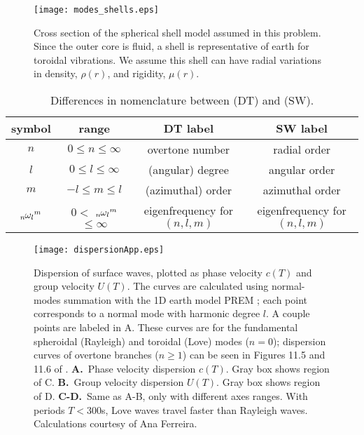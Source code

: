 \documentclass[11pt,titlepage,fleqn]{article}
\newcommand{\omnl}{\mbox{${}_{n\hspace{-0.2 mm}}\omega_l$}}
\begin{document}

\begin{figure}[h]
\begin{center}
\texttt{[image: modes\_shells.eps]}
\caption[]
{{
Cross section of the spherical shell model assumed in this problem. Since the outer core is fluid, a shell is representative of earth for toroidal vibrations. We assume this shell can have radial variations in density, $\rho(r)$, and rigidity, $\mu(r)$.
\label{fig:shells}
}}
\end{center}
\end{figure}



\begin{table}[h]
\begin{center}
\caption[]
{{
Differences in nomenclature between \citet{DT} (DT) and \citet{SteinWysession} (SW).
\label{tab:names}
}}
\tgap
\begin{tabular}{||c|c|c|c||}
\hline
symbol & range & DT label & SW label \\ \hline\hline
$n$ & $0 \le n \le \infty$ & overtone number & radial order \\ \hline
$l$ & $0 \le l \le \infty$ & (angular) degree & angular order \\ \hline
$m$ & $-l \le m \le l$ & (azimuthal) order & azimuthal order \\ \hline
$\omnl^m$ & $0 < $ $\omnl^m$ $ \le \infty$ & eigenfrequency for $(n,l,m)$ & eigenfrequency for $(n,l,m)$ \\ \hline
\end{tabular}
\end{center}
\end{table}



\clearpage\pagebreak
\begin{figure}
\begin{center}
\texttt{[image: dispersionApp.eps]}
\end{center}
\caption[Dispersion of surface waves]
{{
Dispersion of surface waves, plotted as phase velocity $c(T)$ and group velocity $U(T)$. The curves are calculated using normal-modes summation with the 1D earth model PREM \citep{PREM}; each point corresponds to a normal mode with harmonic degree $l$. A couple points are labeled in A. These curves are for the fundamental spheroidal (Rayleigh) and toroidal (Love) modes ($n = 0$); dispersion curves of overtone branches ($n \ge 1$)  can be seen in Figures 11.5 and 11.6 of \citet{DT}.
{\bf A.}~Phase velocity dispersion $c(T)$. Gray box shows region of C.
{\bf B.}~Group velocity dispersion $U(T)$. Gray box shows region of D.
{\bf C-D.}~Same as A-B, only with different axes ranges. With periods $T<300$s, Love waves travel faster than Rayleigh waves. Calculations courtesy of Ana Ferreira.
}}
\label{fig:dispersionApp}
\end{figure}
\end{document}
